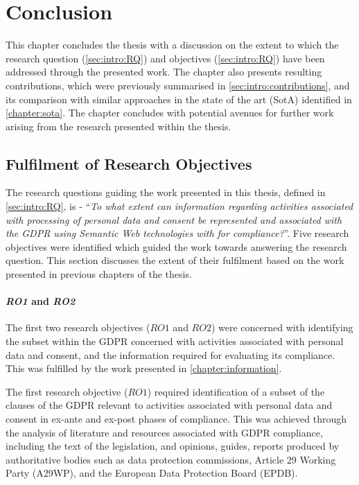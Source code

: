 \chapter{Conclusion}\label{chapter:conclusion}
This chapter concludes the thesis with a discussion on the extent to which the research question (\autoref{sec:intro:RQ}) and objectives (\autoref{sec:intro:RQ}) have been addressed through the presented work. The chapter also presents resulting contributions,  which were previously summarised in \autoref{sec:intro:contributions}, and its comparison with similar approaches in the state of the art (SotA) identified in \autoref{chapter:sota}. The chapter concludes with potential avenues for further work arising from the research presented within the thesis.

\section{Fulfilment of Research Objectives}\label{sec:conclusion-RO}
The research questions guiding the work presented in this thesis, defined in \autoref{sec:intro:RQ}, is - ``\textit{To what extent can information regarding activities associated with processing of personal data and consent be represented and associated with the GDPR using Semantic Web technologies with for compliance?}''.
Five research objectives were identified which guided the work towards answering the research question.
This section discusses the extent of their fulfilment based on the work presented in previous chapters of the thesis.

\subsubsection*{\textit{RO1} and \textit{RO2}}
The first two research objectives ($RO1$ and $RO2$) were concerned with identifying the subset within the GDPR concerned with activities associated with personal data and consent, and the information required for evaluating its compliance. This was fulfilled by the work presented in \autoref{chapter:information}.

The first research objective ($RO1$) required identification of a subset of the clauses of the GDPR relevant to activities associated with personal data and consent in ex-ante and ex-post phases of compliance. 
This was achieved through the analysis of literature and resources associated with GDPR compliance, including the text of the legislation, and opinions, guides, reports produced by authoritative bodies such as data protection commissions, Article 29 Working Party (A29WP), and the European Data Protection Board (EPDB).


